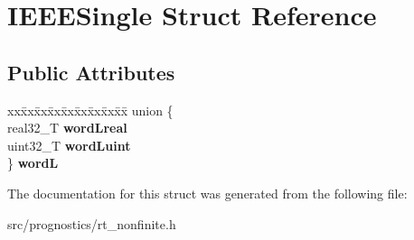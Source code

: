 \hypertarget{structIEEESingle}{}\section{I\+E\+E\+E\+Single Struct Reference}
\label{structIEEESingle}
\subsection*{Public Attributes}
\begin{DoxyCompactItemize}
\item 
\mbox{\label{structIEEESingle_a8b563d9687e557caaa1b73f7ffd8f067}} 
\begin{tabbing}
xx\=xx\=xx\=xx\=xx\=xx\=xx\=xx\=xx\=\kill
union \{\\
\>real32\_T {\bfseries wordLreal}\\
\>uint32\_T {\bfseries wordLuint}\\
\} {\bfseries wordL}\\

\end{tabbing}\end{DoxyCompactItemize}


The documentation for this struct was generated from the following file\+:\begin{DoxyCompactItemize}
\item 
src/prognostics/rt\+\_\+nonfinite.\+h\end{DoxyCompactItemize}
